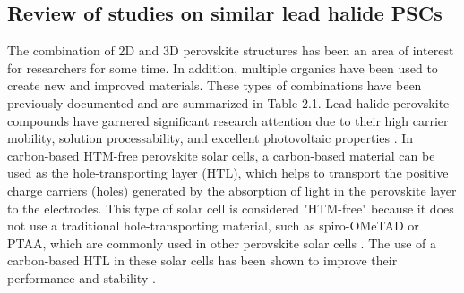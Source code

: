     \subsection{Review of studies on similar lead halide PSCs}
The combination of 2D and 3D perovskite structures has been an area of interest for researchers for some time. In addition, multiple organics have been used to create new and improved materials. These types of combinations have been previously documented and are summarized in Table 2.1. Lead halide perovskite compounds have garnered significant research attention due to their high carrier mobility, solution processability, and excellent photovoltaic properties \cite{pool_thermal_2017,sewvandi_antiferroelectric_2016,wang_surface_2017}. In carbon-based HTM-free perovskite solar cells, a carbon-based material can be used as the hole-transporting layer (HTL), which helps to transport the positive charge carriers (holes) generated by the absorption of light in the perovskite layer to the electrodes. This type of solar cell is considered "HTM-free" because it does not use a traditional hole-transporting material, such as spiro-OMeTAD or PTAA, which are commonly used in other perovskite solar cells \cite{tumen-ulzii_mini-review_2021,hawash_recent_2018,shariatinia_recent_2020}. The use of a carbon-based HTL in these solar cells has been shown to improve their performance and stability \cite{pean_investigating_2020,lee_highly_2018,maniarasu_recent_2018}.
